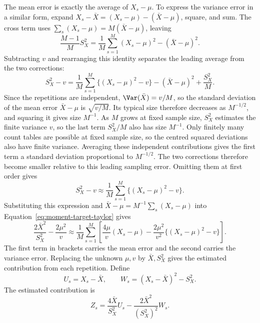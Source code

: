 The mean error is exactly the average of \(X_s-\mu\). To express the
variance error in a similar form, expand
\(X_s-\bar X=(X_s-\mu)-(\bar X-\mu)\), square, and sum. The cross
term uses \(\sum_s(X_s-\mu)=M(\bar X-\mu)\), leaving
\begin{equation}
 \frac{M-1}{M}S_X^2
 =\frac1M\sum_{s=1}^M(X_s-\mu)^2-(\bar X-\mu)^2.
 \label{eq:moment-variance-centring}
\end{equation}
Subtracting \(v\) and rearranging this identity separates the leading
average from the two corrections:
\begin{equation*}
 S_X^2-v
 =\frac1M\sum_{s=1}^M\{(X_s-\mu)^2-v\}
   -(\bar X-\mu)^2+\frac{S_X^2}{M}.
\end{equation*}
Since the repetitions are independent, \(\Var(\bar X)=v/M\), so the
standard deviation of the mean error \(\bar X-\mu\) is
\(\sqrt{v/M}\). Its typical size therefore decreases as
\(M^{-1/2}\), and squaring it gives size \(M^{-1}\). As \(M\) grows
at fixed sample size, \(S_X^2\) estimates the finite variance \(v\),
so the last term \(S_X^2/M\) also has size \(M^{-1}\).
Only finitely many count tables are possible at fixed sample size, so the
centred squared deviations also have finite variance. Averaging these
independent contributions gives the first term a standard deviation
proportional to \(M^{-1/2}\). The two corrections therefore become smaller
relative to this leading sampling error.
Omitting them at first order gives
\begin{equation}
 S_X^2-v\approx\frac1M\sum_{s=1}^M\{(X_s-\mu)^2-v\}.
\end{equation}
Substituting this expression and
\(\bar X-\mu=M^{-1}\sum_s(X_s-\mu)\) into
Equation~\eqref{eq:moment-target-taylor} gives
\begin{equation}
 \frac{2\bar X^2}{S_X^2}-\frac{2\mu^2}{v}
 \approx\frac1M\sum_{s=1}^M
 \left[\frac{4\mu}{v}(X_s-\mu)
       -\frac{2\mu^2}{v^2}\{(X_s-\mu)^2-v\}\right].
 \label{eq:moment-target-average-error}
\end{equation}
The first term in brackets carries the mean error and the second carries
the variance error. Replacing the unknown \(\mu,v\) by
\(\bar X,S_X^2\) gives the estimated contribution from each repetition.
Define
\begin{equation}
 U_s=X_s-\bar X,\qquad W_s=(X_s-\bar X)^2-S_X^2.
\end{equation}
The estimated contribution is
\begin{equation}
 Z_s=\frac{4\bar X}{S_X^2}U_s
       -\frac{2\bar X^2}{(S_X^2)^2}W_s.
 \label{eq:moment-df-mc-contribution}
\end{equation}
